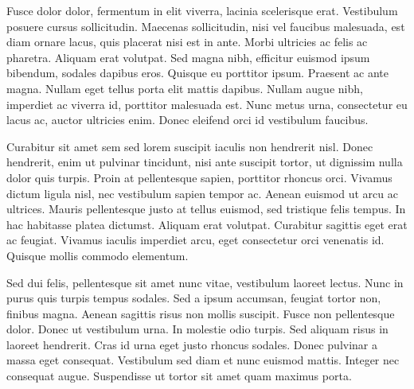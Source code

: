 Fusce dolor dolor, fermentum in elit viverra, lacinia scelerisque erat. Vestibulum posuere cursus sollicitudin. Maecenas sollicitudin, nisi vel faucibus malesuada, est diam ornare lacus, quis placerat nisi est in ante. Morbi ultricies ac felis ac pharetra. Aliquam erat volutpat. Sed magna nibh, efficitur euismod ipsum bibendum, sodales dapibus eros. Quisque eu porttitor ipsum. Praesent ac ante magna. Nullam eget tellus porta elit mattis dapibus. Nullam augue nibh, imperdiet ac viverra id, porttitor malesuada est. Nunc metus urna, consectetur eu lacus ac, auctor ultricies enim. Donec eleifend orci id vestibulum faucibus.

Curabitur sit amet sem sed lorem suscipit iaculis non hendrerit nisl. Donec hendrerit, enim ut pulvinar tincidunt, nisi ante suscipit tortor, ut dignissim nulla dolor quis turpis. Proin at pellentesque sapien, porttitor rhoncus orci. Vivamus dictum ligula nisl, nec vestibulum sapien tempor ac. Aenean euismod ut arcu ac ultrices. Mauris pellentesque justo at tellus euismod, sed tristique felis tempus. In hac habitasse platea dictumst. Aliquam erat volutpat. Curabitur sagittis eget erat ac feugiat. Vivamus iaculis imperdiet arcu, eget consectetur orci venenatis id. Quisque mollis commodo elementum.

Sed dui felis, pellentesque sit amet nunc vitae, vestibulum laoreet lectus. Nunc in purus quis turpis tempus sodales. Sed a ipsum accumsan, feugiat tortor non, finibus magna. Aenean sagittis risus non mollis suscipit. Fusce non pellentesque dolor. Donec ut vestibulum urna. In molestie odio turpis. Sed aliquam risus in laoreet hendrerit. Cras id urna eget justo rhoncus sodales. Donec pulvinar a massa eget consequat. Vestibulum sed diam et nunc euismod mattis. Integer nec consequat augue. Suspendisse ut tortor sit amet quam maximus porta.